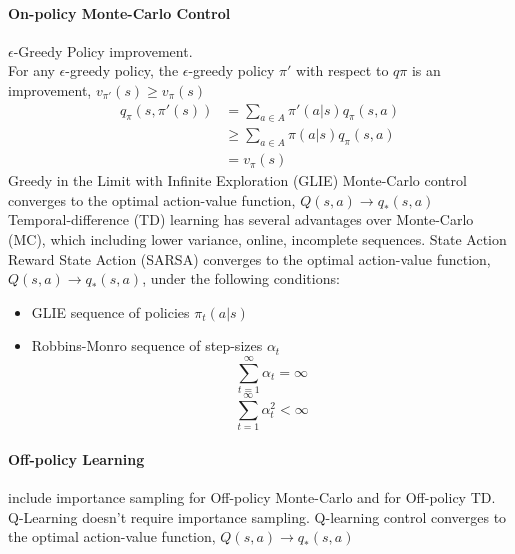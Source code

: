 \documentclass[10pt,twocolumn,letterpaper]{article}
\begin{document}
	\paragraph{On-policy Monte-Carlo Control} $\epsilon$-Greedy Policy improvement. \\
	For any $\epsilon$-greedy policy, the $\epsilon$-greedy policy $\pi '$ with respect to $q\pi$ is an improvement, $v_{\pi '}(s) \geq v_{\pi}(s)$
	\begin{equation}
		\begin{aligned}
			q_\pi (s, \pi '(s))&=\sum_{a \in A} \pi'(a|s) q_\pi (s,a)\\
			&\geq \sum_{a \in A} \pi (a|s) q_\pi (s,a)\\
			& = v_\pi (s)
		\end{aligned}
	\end{equation}
	Greedy in the Limit with Infinite Exploration (GLIE) Monte-Carlo control converges to the optimal action-value function, $Q(s, a) \rightarrow q_\ast (s, a)$\\
	Temporal-difference (TD) learning has several advantages over Monte-Carlo (MC), which including lower variance, online, incomplete sequences. State Action Reward State Action (SARSA) converges to the optimal action-value function, $Q(s, a) \rightarrow q_\ast (s, a)$, under the following conditions:
	\begin{itemize}
		\item GLIE sequence of policies $\pi_t (a|s)$
		\item Robbins-Monro sequence of step-sizes $\alpha_t$
		$$\sum_{t=1}^{\infty}\alpha_t = \infty$$
		$$\sum_{t=1}^{\infty}\alpha_t^2 < \infty$$
	\end{itemize}
	\paragraph{Off-policy Learning} include importance sampling for Off-policy Monte-Carlo and for Off-policy TD. Q-Learning doesn't require importance sampling. Q-learning control converges to the optimal action-value function, $Q(s, a) \rightarrow q_\ast (s, a)$
	
	
	
\end{document}

